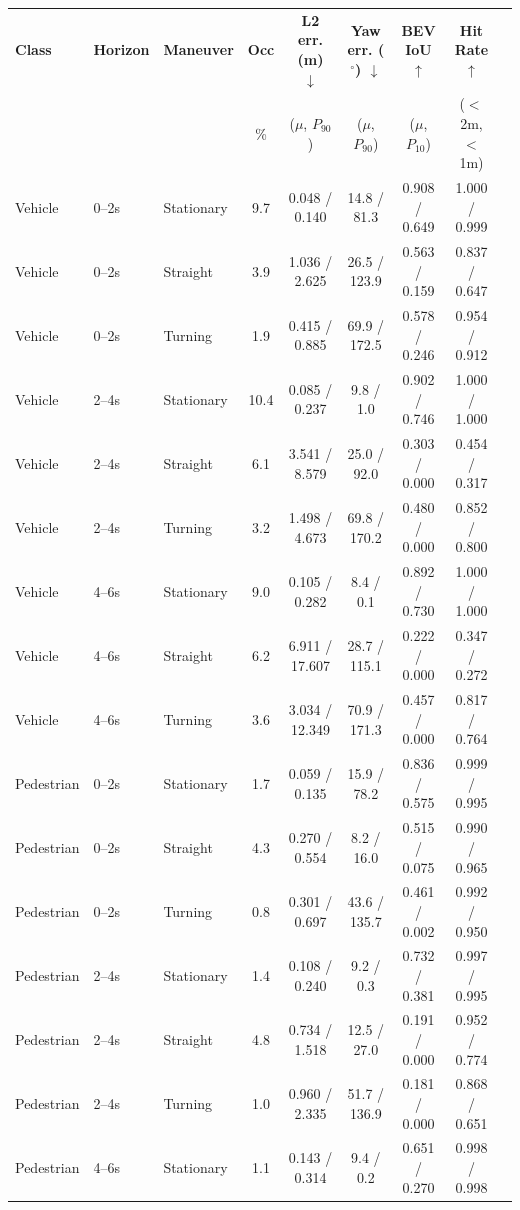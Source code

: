 \begin{tabular}{lllcccccc}
\toprule
\textbf{Class} & \textbf{Horizon} & \textbf{Maneuver} & \textbf{Occ} & \textbf{L2 err. (m) $\downarrow$} & \textbf{Yaw err. ($^\circ$) $\downarrow$} & \textbf{BEV IoU $\uparrow$} & \textbf{Hit Rate $\uparrow$} \\
 & & & \% & ($\mu$, $P_{90}$) & ($\mu$, $P_{90}$) & ($\mu$, $P_{10}$) & ($<$2m, $<$1m) \\
\midrule
Vehicle & 0--2s & Stationary & 9.7 & 0.048 / 0.140 & 14.8 / 81.3 & 0.908 / 0.649 & 1.000 / 0.999 \\
Vehicle & 0--2s & Straight & 3.9 & 1.036 / 2.625 & 26.5 / 123.9 & 0.563 / 0.159 & 0.837 / 0.647 \\
Vehicle & 0--2s & Turning & 1.9 & 0.415 / 0.885 & 69.9 / 172.5 & 0.578 / 0.246 & 0.954 / 0.912 \\
Vehicle & 2--4s & Stationary & 10.4 & 0.085 / 0.237 & 9.8 / 1.0 & 0.902 / 0.746 & 1.000 / 1.000 \\
Vehicle & 2--4s & Straight & 6.1 & 3.541 / 8.579 & 25.0 / 92.0 & 0.303 / 0.000 & 0.454 / 0.317 \\
Vehicle & 2--4s & Turning & 3.2 & 1.498 / 4.673 & 69.8 / 170.2 & 0.480 / 0.000 & 0.852 / 0.800 \\
Vehicle & 4--6s & Stationary & 9.0 & 0.105 / 0.282 & 8.4 / 0.1 & 0.892 / 0.730 & 1.000 / 1.000 \\
Vehicle & 4--6s & Straight & 6.2 & 6.911 / 17.607 & 28.7 / 115.1 & 0.222 / 0.000 & 0.347 / 0.272 \\
Vehicle & 4--6s & Turning & 3.6 & 3.034 / 12.349 & 70.9 / 171.3 & 0.457 / 0.000 & 0.817 / 0.764 \\
\midrule
Pedestrian & 0--2s & Stationary & 1.7 & 0.059 / 0.135 & 15.9 / 78.2 & 0.836 / 0.575 & 0.999 / 0.995 \\
Pedestrian & 0--2s & Straight & 4.3 & 0.270 / 0.554 & 8.2 / 16.0 & 0.515 / 0.075 & 0.990 / 0.965 \\
Pedestrian & 0--2s & Turning & 0.8 & 0.301 / 0.697 & 43.6 / 135.7 & 0.461 / 0.002 & 0.992 / 0.950 \\
Pedestrian & 2--4s & Stationary & 1.4 & 0.108 / 0.240 & 9.2 / 0.3 & 0.732 / 0.381 & 0.997 / 0.995 \\
Pedestrian & 2--4s & Straight & 4.8 & 0.734 / 1.518 & 12.5 / 27.0 & 0.191 / 0.000 & 0.952 / 0.774 \\
Pedestrian & 2--4s & Turning & 1.0 & 0.960 / 2.335 & 51.7 / 136.9 & 0.181 / 0.000 & 0.868 / 0.651 \\
Pedestrian & 4--6s & Stationary & 1.1 & 0.143 / 0.314 & 9.4 / 0.2 & 0.651 / 0.270 & 0.998 / 0.998 \\

\end{tabular}
